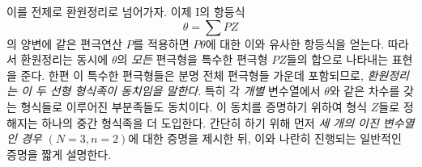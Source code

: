 
이를 전제로 환원정리로 넘어가자. 이제 I의 항등식
\[
  \theta=\sum PZ
\]
의 양변에 같은 편극연산 $P$를 적용하면 $P\theta$에 대한 이와 유사한 항등식을 얻는다. 따라서 환원정리는 동시에 $\theta$의 \emph{모든} 편극형을 특수한 편극형 $PZ$들의 합으로 나타내는 표현을 준다. 한편 이 특수한 편극형들은 분명 전체 편극형들 가운데 포함되므로, \emph{환원정리는 이 두 선형 형식족이 동치임을 말한다}. 특히 각 \emph{개별} 변수열에서 $\theta$와 같은 차수를 갖는 형식들로 이루어진 부분족들도 동치이다. 이 동치를 증명하기 위하여 형식 $Z$들로 정해지는 하나의 중간 형식족을 더 도입한다. 간단히 하기 위해 먼저 \emph{세 개의 이진 변수열인 경우 $(N=3,n=2)$}에 대한 증명을 제시한 뒤, 이와 나란히 진행되는 일반적인 증명을 짧게 설명한다.
